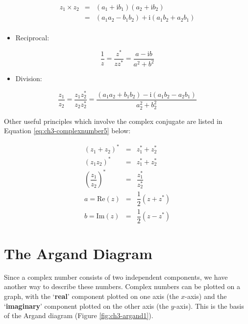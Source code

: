 \documentclass[
]{book}
\providecommand{\tightlist}{%
  \setlength{\itemsep}{0pt}\setlength{\parskip}{0pt}}
\begin{document}
\begin{equation}
\begin{array}{rcl}
z_1 \times  z_2 &=& (a_1 + \mathrm{i}b_1) (a_2 + \mathrm{i}b_2) \\
 &=& (a_1 a_2 - b_1 b_2) + \mathrm{i}(a_1 b_2 + a_2 b_1) \\
\end{array}
\end{equation}

\begin{itemize}
\tightlist
\item
  Reciprocal:
\end{itemize}

\begin{equation}
\frac{1}{z} = \frac{z^* }{z z^* } = \frac{a - \mathrm{i}b }{a^2 + b^2 }
\end{equation}

\begin{itemize}
\tightlist
\item
  Division:
\end{itemize}

\begin{equation}
\frac{z_1}{z_2} = \frac{z_1 z_2^* }{z_2 z_2^* } = \frac{(a_1 a_2 + b_1 b_2) - \mathrm{i}(a_1 b_2 - a_2 b_1)}{a_2^2 + b_2^2 }
\end{equation}

Other useful principles which involve the complex conjugate are listed in Equation \eqref{eq:ch3-complexnumber5} below:

\begin{equation}
\begin{array}{rcl}
(z_1 + z_2)^* &=& z_1^* + z_2^*\\
(z_1  z_2)^* &=& z_1^* + z_2^* \\
\left( \dfrac{z_1}{z_2} \right)^* &=& \dfrac{z_1^* }{z_2^* } \\
a = \mathrm{Re}(z) &=& \dfrac{1}{2}(z + z^* ) \\
b = \mathrm{Im}(z) &=& \dfrac{1}{2}(z - z^* ) 
\end{array}
\label{eq:ch3-complexnumber5}
\end{equation}

\hypertarget{sec:ch3-arganddiagram}{%
\section{The Argand Diagram}\label{sec:ch3-arganddiagram}}

Since a complex number consists of two independent components, we have another way to describe these numbers. Complex numbers can be plotted on a graph, with the `\textbf{real}' component plotted on one axis (the \(x\)-axis) and the `\textbf{imaginary}' component plotted on the other axis (the \(y\)-axis). This is the basis of the Argand diagram (Figure \ref{fig:ch3-argand1}).
\end{document}
